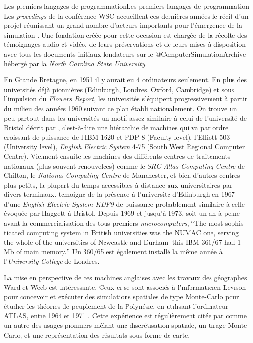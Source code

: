 \begin{testiv}{Les premiers langages de programmation}{Les premiers langages de programmation}
Les \textit{procedings} de la conférence WSC accueillent ces dernières années le récit d'un projet réunissant un grand nombre d'acteurs importants pour l'émergence de la simulation \autocite{Nance2013}. Une fondation créée pour cette occasion est chargée de la récolte des témoignages audio et vidéo, de leurs préservations et de leurs mises à disposition avec tous les documents initiaux fondateurs sur le \href{http://d.lib.ncsu.edu/computer-simulation/}{@ComputerSimulationArchive} hébergé par la \textit{North Carolina State University}.
\end{testiv}

En Grande Bretagne, en 1951 il y aurait eu 4 ordinateurs seulement. En plus des universités déjà pionnières (Edinburgh, Londres, Oxford, Cambridge) et sous l'impulsion du \textit{Flowers Report}, les universités s'équipent progressivement à partir du milieu des années 1960 suivant ce plan établi nationalement. On trouve un peu partout dans les universités un motif assez similaire à celui de l'université de Bristol décrit par \textcite{Haggett1969}, c'est-à-dire une hiérarchie de machines qui va par ordre croissant de puissance de l'IBM 1620 et PDP 8 (Faculty level), l'Elliott 503 (University level), \textit{English Electric System} 4-75 (South West Regional Computer Centre). Viennent ensuite les machines des différents centres de traitements nationaux (plus souvent renouvelées) comme le \textit{SRC Atlas Computing Centre} de Chilton, le \textit{National Computing Centre} de Manchester, et bien d'autres centres plus petits, la plupart du temps accessibles à distance aux universitaires par divers terminaux. \textcite{Rhind1989} témoigne de la présence à l'université d'Edinburgh en 1967 d'une \textit{English Electric System KDF9} de puissance probablement similaire à celle évoquée par Haggett à Bristol. Depuis 1969 et jusqu'à 1973, soit un an à peine avant la commercialisation des tous premiers \textit{microcomputers}, \foreignquote{english}{The most sophisticated computing system in British universities was the NUMAC one, serving the whole of the universities of Newcastle and Durham: this IBM 360/67 had 1 Mb of main memory.} Un 360/65 est également installé la même année à l'\textit{University College} de Londres.

La mise en perspective de ces machines anglaises avec les travaux des géographes Ward et Weeb est intéressante. Ceux-ci se sont associés à l'informaticien Levison pour concevoir et exécuter des simulations spatiales de type Monte-Carlo pour étudier les théories de peuplement de la Polynésie, en utilisant l'ordinateur ATLAS, entre 1964 et 1971 \autocites{Montillier1974, Ward1973}. Cette expérience est régulièrement citée par \textcites{Gould1970, Gould1975} comme un autre des usages pionniers mêlant une discrétisation spatiale, un tirage Monte-Carlo, et une représentation des résultats sous forme de carte.

